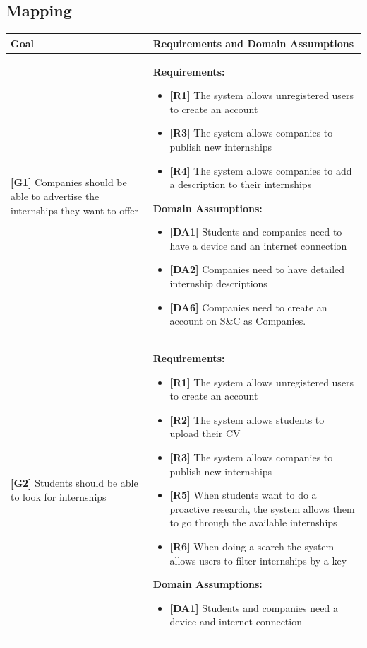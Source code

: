 \subsection{Mapping}



\begin{longtable}{|p{}|p{}|}
\hline
\textbf{Goal} & \textbf{Requirements and Domain Assumptions} \\
\hline
\textbf{[G1]} Companies should be able to advertise the internships they want to offer 
& 
\textbf{Requirements:}
\begin{itemize}
     \item \textbf{[R1]} The system allows unregistered users to create an account
    \item \textbf{[R3]} The system allows companies to publish new internships
    \item \textbf{[R4]} The system allows companies to add a description to their internships
\end{itemize}
\textbf{Domain Assumptions:}
\begin{itemize}
    \item \textbf{[DA1]} Students and companies need to have a device and an internet connection
    \item \textbf{[DA2]} Companies need to have detailed internship descriptions
    \item \textbf{[DA6]} Companies need to create an account on S\&C as Companies.
\end{itemize} \\
\hline
\textbf{[G2]} Students should be able to look for internships 
& 
\textbf{Requirements:}
\begin{itemize}
     \item \textbf{[R1]} The system allows unregistered users to create an account
    \item \textbf{[R2]} The system allows students to upload their CV
    \item \textbf{[R3]} The system allows companies to publish new internships
    \item \textbf{[R5]} When students want to do a proactive research, the system allows them to go through the available internships
    \item \textbf{[R6]} When doing a search the system allows users to filter internships by a key
\end{itemize}
\textbf{Domain Assumptions:}
\begin{itemize}
    \item \textbf{[DA1]} Students and companies need a device and internet connection

\end{itemize}
\end{longtable}

